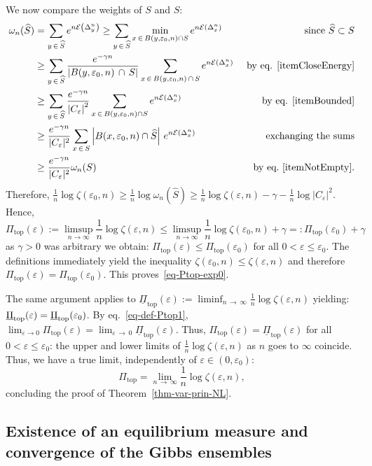 \documentclass[10pt]{amsart}
\theoremstyle{definition}\newtheorem{defi}[theo]{Definition}\newtheorem{rema}[theo]{Remark}\newtheorem{exam}[theo]{Example}\newtheorem{exem}[theo]{Example}\newtheorem{nota}[theo]{Notation}
\theoremstyle{plain}
\theoremstyle{plain}
\newcommand\eps{\varepsilon}
\newcommand\NLP{\Pi}
\renewcommand\top{{\mathrm{top}}}
\newcommand*\8{\infty}
\newcommand\hS{\widehat{S}}
\newcommand{\En}{\mathcal{E}}
\begin{document}
We now compare the weights of $S$ and $\hS$:
\begin{align*}
\omega_n(\hS) &= \sum_{y\,\in\,\hS} e^{n\En\left(\Delta^n_y\right)}
\geq \sum_{y\,\in\,\hS} \min_{x\,\in\,B(y,\eps_0,n)\cap S} e^{n\En\left(\Delta^n_x\right)} &\text{since }\hS\subset S\\
&\geq \sum_{y\,\in\,\hS} \frac{e^{-\gamma n} }{\left\lvert B(y,\eps_0,n)\,\cap\,S\right\rvert} \sum_{x\,\in\,B(y,\eps_0,n)\,\cap\,S} e^{n\En\left(\Delta^n_x\right)} &\text{ by eq. \eqref{itemCloseEnergy}}\\
&\geq \sum_{y\,\in\,\hS} \frac{e^{-\gamma n}}{\left\lvert C_\eps\right\rvert^2} \sum_{x\,\in\,B(y,\eps_0,n)\cap S} e^{n\En\left(\Delta^n_x\right)} &\text{ by eq. \eqref{itemBounded}}\\
&\geq \frac{e^{-\gamma n}}{\lvert C_\eps\rvert^2} \sum_{x\,\in\,S} \left\lvert B(x,\eps_0,n)\cap\hS\right\rvert \, e^{n\En\left(\Delta^n_x\right)} & \text{exchanging the sums}\\
&\geq \frac{e^{-\gamma n}}{\lvert C_\eps\rvert^2} \omega_n(S) &\text{ by eq.~\eqref{itemNotEmpty}}.
\end{align*}
Therefore, $\frac1n\log\zeta(\eps_0,n)\geq \frac1n\log\omega_n(\hS)\geq\frac1n\log\zeta(\eps,n)-\gamma-\frac1n\log\lvert C_\eps\rvert^2$. Hence,
\[
\Pi_\top(\eps):=\limsup_{n\to\infty}\frac1n\log\zeta(\eps,n)\leq \limsup_{n\to\infty}\frac1n\log\zeta(\eps_0,n)+\gamma=:\Pi_\top(\eps_0)+\gamma
\]
as $\gamma>0$ was arbitrary we obtain: $\NLP_\top(\eps)\leq\NLP_\top(\eps_0)$ for all $0<\eps\leq\eps_0$. The definitions immediately yield the inequality $\zeta(\eps_0,n)\leq\zeta(\eps,n)$ and therefore $\NLP_\top(\eps)=\NLP_\top(\eps_0)$. This proves~\eqref{eq-Ptop-exp0}.



The same argument applies to $\underline{\NLP}_\top(\eps):=\liminf_{n\,\to\,\infty}\frac1n\log\zeta(\eps,n)$ yielding: $\underline{\NLP}_\top(\eps)\linebreak = \underline{\NLP}_\top(\eps_0)$. By eq.~\eqref{eq-def-Ptop1}, $\lim_{\eps\to0} \NLP_\top(\eps)= \lim_{\eps\,\to\,0} \underline{\NLP} _\top(\eps)$. Thus, $\NLP_\top(\eps)= \underline{\NLP} _\top(\eps)$ for all $0<\eps\leq\eps_0$: the upper and lower limits of $\frac1n\log\zeta(\eps,n)$ as $n$ goes to $\infty$ coincide. Thus, we have a true limit, independently of $\eps\in(0,\eps_0)$:
\[
\NLP_\top = \lim_{n\,\to\,\infty} \frac1n\log\zeta(\eps,n),
\]
concluding the proof of Theorem~\ref{thm-var-prin-NL}.


\subsection{Existence of an equilibrium measure and convergence of the Gibbs ensembles}\label{sec:Gibbs}
\end{document}

